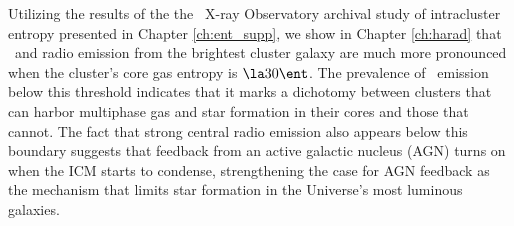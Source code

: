 Utilizing the results of the the \chandra\ X-ray Observatory archival
study of intracluster entropy presented in Chapter \ref{ch:ent_supp},
we show in Chapter \ref{ch:harad} that \halpha\ and radio emission
from the brightest cluster galaxy are much more pronounced when the
cluster's core gas entropy is $\la 30 \ent$. The prevalence of
\halpha\ emission below this threshold indicates that it marks a
dichotomy between clusters that can harbor multiphase gas and star
formation in their cores and those that cannot. The fact that strong
central radio emission also appears below this boundary suggests that
feedback from an active galactic nucleus (AGN) turns on when the ICM
starts to condense, strengthening the case for AGN feedback as the
mechanism that limits star formation in the Universe's most luminous
galaxies.
